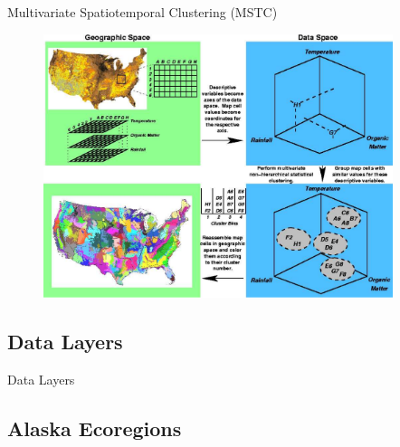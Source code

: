 \begin{frame}{Multivariate Spatiotemporal Clustering (MSTC)}
 \vskip-0.15in
 \begin{figure}
  \begin{center}
   \includegraphics[width=0.91\textwidth]{ngee_figures/clusterfinal3}
  \end{center}
 \end{figure}
\end{frame}

\subsection{Data Layers}

\begin{frame}{Data Layers}\footnotesize
 

\end{frame}

\subsection[Ecoregions]{Alaska Ecoregions}

